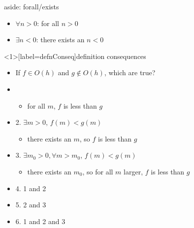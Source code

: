 \begin{frame}{aside: forall/exists}
    \begin{itemize}
        \item $\forall n > 0$: for all $n > 0$
        \item $\exists n < 0 $: there exists an $n < 0$
    \end{itemize}
\end{frame}

\begin{frame}<1>[label=defnConseq]{definition consequences}
    \begin{itemize}
        \item If $f \in O(h)$ and $g \not\in O(h)$, which are true?
        \item {}
                \begin{itemize}
                \item for all $m$, $f$ is less than $g$
                \end{itemize}
        \item 2. $\exists m>0$, $f(m)<g(m)$
                \begin{itemize}
                \item there exists an $m$, so $f$ is less than $g$
                \end{itemize}
        \item 3. $\exists m_0>0, \forall m>m_0$, $f(m)<g(m)$
                \begin{itemize}
                \item there exists an $m_0$, so for all $m$ larger, $f$ is less than $g$
                \end{itemize}
        \item 4. 1 and 2
        \item 5. 2 and 3
        \item 6. 1 and 2 and 3
    \end{itemize}
\end{frame}

\newcommand{\notimplies}{%
  \mathrel{{\ooalign{\hidewidth$\not\phantom{=}$\hidewidth\cr$\implies$}}}}


